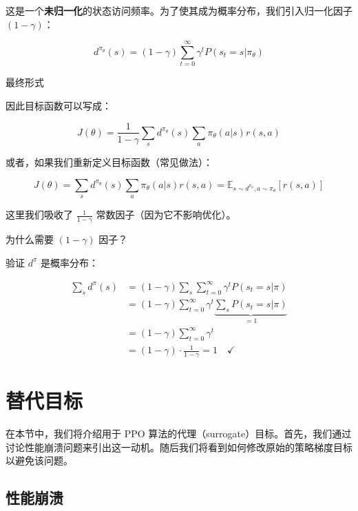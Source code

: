 \documentclass[lang=cn,newtx,10pt,scheme=chinese]{elegantbook}
\begin{document}
这是一个\textbf{未归一化}的状态访问频率。为了使其成为概率分布，我们引入归一化因子 $(1-\gamma)$：

\begin{equation}
d^{\pi_\theta}(s) = (1-\gamma) \sum_{t=0}^{\infty} \gamma^t P(s_t=s | \pi_\theta)
\end{equation}

最终形式

因此目标函数可以写成：

\begin{equation}
\boxed{J(\theta) = \frac{1}{1-\gamma} \sum_s d^{\pi_\theta}(s) \sum_a \pi_\theta(a|s) r(s,a)}
\end{equation}

或者，如果我们重新定义目标函数（常见做法）：

\begin{equation}
\boxed{J(\theta) = \sum_s d^{\pi_\theta}(s) \sum_a \pi_\theta(a|s) r(s,a) = \mathbb{E}_{s \sim d^{\pi_\theta}, a \sim \pi_\theta}[r(s,a)]}
\end{equation}

这里我们吸收了 $\frac{1}{1-\gamma}$ 常数因子（因为它不影响优化）。

为什么需要 $(1-\gamma)$ 因子？

验证 $d^\pi$ 是概率分布：

\begin{equation}
\begin{aligned}
\sum_s d^\pi(s) &= (1-\gamma) \sum_s \sum_{t=0}^{\infty} \gamma^t P(s_t=s|\pi) \\
&= (1-\gamma) \sum_{t=0}^{\infty} \gamma^t \underbrace{\sum_s P(s_t=s|\pi)}_{=1} \\
&= (1-\gamma) \sum_{t=0}^{\infty} \gamma^t \\
&= (1-\gamma) \cdot \frac{1}{1-\gamma} = 1 \quad \checkmark
\end{aligned}
\end{equation}

\section{替代目标}

在本节中，我们将介绍用于 PPO 算法的代理（surrogate）目标。首先，我们通过讨论性能崩溃问题来引出这一动机。随后我们将看到如何修改原始的策略梯度目标以避免该问题。

\subsection{性能崩溃}
\end{document}
